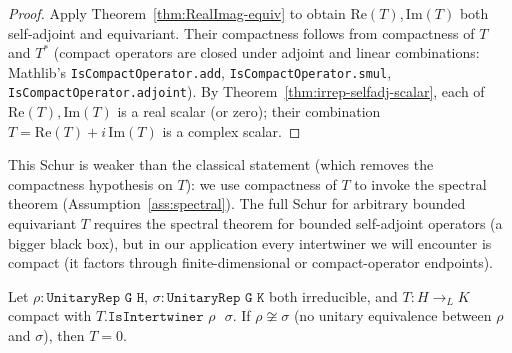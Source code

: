 \begin{proof}
  Apply Theorem~\ref{thm:RealImag-equiv} to obtain
  $\mathrm{Re}(T), \mathrm{Im}(T)$ both self-adjoint and equivariant.
  Their compactness follows from compactness of $T$ and
  $T^*$ (compact operators are closed under adjoint and linear
  combinations: Mathlib's
  \texttt{IsCompactOperator.add},
  \texttt{IsCompactOperator.smul},
  \texttt{IsCompactOperator.adjoint}).
  By Theorem~\ref{thm:irrep-selfadj-scalar}, each of
  $\mathrm{Re}(T), \mathrm{Im}(T)$ is a real scalar (or zero); their
  combination $T = \mathrm{Re}(T) + i\,\mathrm{Im}(T)$ is a complex scalar.
\end{proof}

\begin{remark}
  This Schur is weaker than the classical statement (which removes
  the compactness hypothesis on $T$): we use compactness of $T$ to
  invoke the spectral theorem
  (Assumption~\ref{ass:spectral}). The full Schur for arbitrary
  bounded equivariant $T$ requires the spectral theorem for bounded
  self-adjoint operators (a bigger black box), but in our application
  every intertwiner we will encounter is compact (it factors through
  finite-dimensional or compact-operator endpoints).
\end{remark}

\begin{theorem}
  \label{thm:schur-distinct}
  Let $\rho : \texttt{UnitaryRep G H}$, $\sigma : \texttt{UnitaryRep G K}$
  both irreducible, and $T : H \to_L K$ compact with
  $T.\texttt{IsIntertwiner $\rho$ $\sigma$}$. If $\rho \not\cong \sigma$
  (no unitary equivalence between $\rho$ and $\sigma$), then $T = 0$.
\end{theorem}

